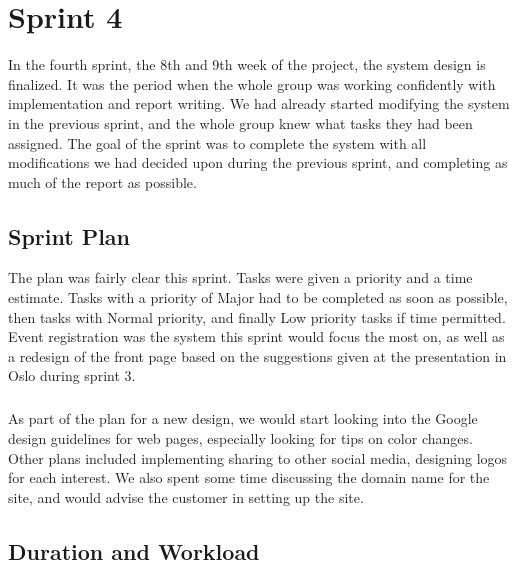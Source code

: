 \chapter{Sprint 4}
\label{chap:S5}

In the fourth sprint, the 8th and 9th week of the project, the system design is finalized. It was the period when the whole group was working confidently with implementation and report writing. We had already started modifying the system in the previous sprint, and the whole group knew what tasks they had been assigned. The goal of the sprint was to complete the system with all modifications we had decided upon during the previous sprint, and completing as much of the report as possible.

\section{Sprint Plan}
\label{sec:S5Plan}

The plan was fairly clear this sprint. Tasks were given a priority and a time estimate. Tasks with a priority of Major had to be completed as soon as possible, then tasks with Normal priority, and finally Low priority tasks if time permitted. Event registration was the system this sprint would focus the most on, as well as a redesign of the front page based on the suggestions given at the presentation in Oslo during sprint 3.

\paragraph{} As part of the plan for a new design, we would start looking into the Google design guidelines for web pages, especially looking for tips on color changes. Other plans included implementing sharing to other social media, designing logos for each interest. We also spent some time discussing the domain name for the site, and would advise the customer in setting up the site.

\section{Duration and Workload}
\label{sec:S5Duration}

